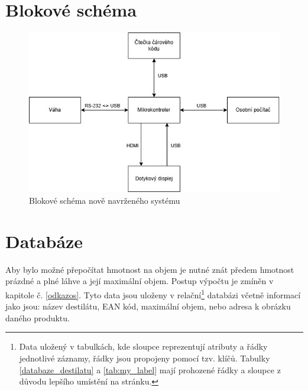 \section{Blokové schéma}
\begin{figure}[!h]
    \begin{center}
        \includegraphics[scale=0.7]{obrazky/Blokové schéma.jpg}
    \end{center}
    \label{blokove_schema}
    \caption{Blokové schéma nově navrženého systému}
\end{figure}

\section{Databáze}
\label{databaze}
Aby bylo možné přepočítat hmotnost na objem je nutné znát předem hmotnost prázdné a plné láhve a její maximální objem. Postup výpočtu je zmíněn v kapitole č. \ref{odkazos}. Tyto data jsou uloženy v relační\footnote{Data uložený v tabulkách, kde sloupce reprezentují atributy a řádky jednotlivé záznamy, řádky jsou propojeny pomocí tzv. klíčů. Tabulky \ref{databaze_destilatu} a \ref{tab:my_label} mají prohozené řádky a sloupce z důvodu lepšího umístění na stránku.} databázi včetně informací jako jsou: název destilátu, EAN kód, maximální objem, nebo adresa k obrázku daného produktu.


